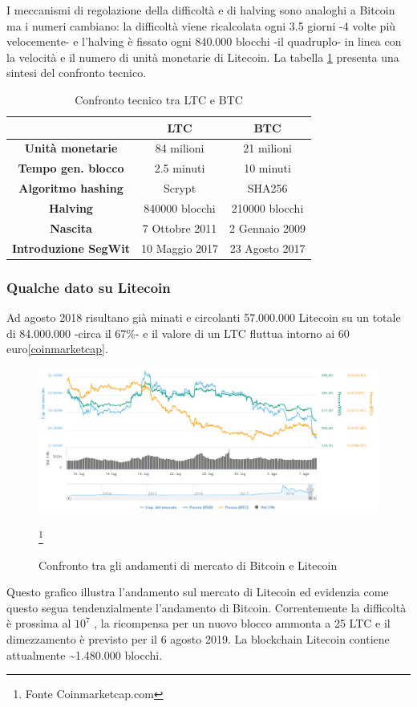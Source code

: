 I meccanismi di regolazione della difficoltà e di halving sono analoghi a Bitcoin ma i numeri cambiano: la difficoltà viene ricalcolata ogni 3.5 giorni -4 volte più velocemente- e l’halving è fissato ogni 840.000 blocchi -il quadruplo- in linea con la velocità e il numero di unità monetarie di Litecoin. La tabella \ref{ltcvsbtc} presenta una sintesi del confronto tecnico.
\cite{litecoinreview}
\begin{table}
\begin{tabular}{|c|c|c|}
	\hline 
	& \textbf{LTC} & \textbf{BTC} \\ 
	\hline 
\textbf{Unità monetarie}& 84 milioni & 21 milioni \\ 
	\hline 
\textbf{Tempo gen. blocco}	& 2.5 minuti & 10 minuti \\ 
	\hline 
\textbf{Algoritmo hashing}	& Scrypt & SHA256 \\ 
	\hline 
\textbf{Halving}	& 840000 blocchi & 210000 blocchi \\ 
	\hline 
\textbf{Nascita}	& 7 Ottobre 2011 & 2 Gennaio 2009 \\ 
	\hline 
\textbf{Introduzione SegWit} & 10 Maggio 2017 & 23 Agosto 2017 \\
\hline
\end{tabular}
\caption{Confronto tecnico tra LTC e BTC}
\label{ltcvsbtc}
\end{table} 

\subsubsection{Qualche dato su Litecoin}
Ad agosto 2018 risultano già minati e circolanti 57.000.000 Litecoin su un totale di 84.000.000 -circa il 67\%- e il valore di un LTC fluttua intorno ai 60 euro\ref{coinmarketcap}.

\begin{figure}[h!]
	\centering
	\includegraphics[width=1.0\linewidth]{images/LitecoinCoinMarketCap}
	\caption{Confronto tra gli andamenti di mercato di Bitcoin e Litecoin}
	\label{fig:litecoincoinmarketcap}
	\footnote{Fonte Coinmarketcap.com}
\end{figure}


Questo grafico illustra l’andamento sul mercato di Litecoin ed evidenzia come questo segua tendenzialmente l’andamento di Bitcoin.
Correntemente la difficoltà è prossima al $10^{7}$   \cite{bitcoinwisdom}, la ricompensa per un nuovo blocco ammonta a 25 LTC e il dimezzamento è previsto per il 6 agosto 2019.
La blockchain Litecoin contiene attualmente \~{}1.480.000 blocchi.

